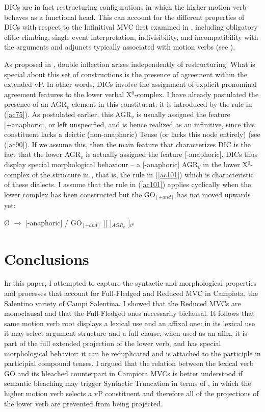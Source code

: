 \documentclass[output=paper]{langscibook}
\begin{document}
DICs are in fact restructuring configurations in which the higher motion verb behaves as a functional head. This can account for the different properties of DICs with respect to the Infinitival MVC first examined in \cite{cardinaletti2001a}, including obligatory clitic climbing, single event interpretation, indivisibility, and incompatibility with the arguments and adjuncts typically associated with motion verbs (see \cite{cardinaletti2001a, cardinaletti2003a, manzini2005a, cruschina2013a, caro2019a}). 

As proposed in \cite{cruschina2021a}, double inflection arises independently of restructuring. What is special about this set of constructions is the presence of agreement within the extended vP. In other words, DICs involve the assignment of explicit pronominal agreement features to the lower verbal X$^0$-complex. I have already postulated the presence of an  AGR$_v$ element in this constituent: it is introduced by the rule in (\ref{ac75}).  As postulated earlier, this AGR$_v$ is usually assigned the feature [+anaphoric], or left unspecified, and is hence realized as an infinitive, since this constituent lacks a deictic (non-anaphoric) Tense (or lacks this node entirely) (see (\ref{ac90}). If we assume this, then the main feature that characterizes DIC is the fact that the lower AGR$_v$ is actually assigned the feature [-anaphoric]. DICs thus display special morphological behaviour  --  a [-anaphoric] AGR$_v$ in the lower X$^0$-complex of the structure in , that is, the rule in (\ref{ac101}) which is characteristic of these dialects. I assume that the rule in (\ref{ac101}) applies cyclically when the lower complex has been constructed but the GO$_{[+and]}$ has not moved upwards yet:
 
\ea \label{ac101}Ø $\rightarrow$ [-anaphoric] /  GO$_{[+and]}$ [[ \underline{\hspace{3em}} ]$_{ AGR_v}$ ]$_{v^0}$
\z

\section{Conclusions} 
 
In this paper, I attempted to capture the syntactic and morphological properties and processes that account for Full-Fledged and Reduced MVC in Campiota, the Salentino variety of Campi Salentina. I showed that the Reduced MVCs are monoclausal and that the Full-Fledged ones necessarily biclausal. It follows that same motion verb root displays a lexical use and an affixal one:  in its lexical use it may select argument structure and a full clause; when used as an affix, it is part of the full extended projection of the lower verb, and has special morphological behavior: it can be reduplicated and is attached to the participle in participial compound tenses. I argued that the relation between the lexical verb GO and its bleached counterpart in Campiota MVCs is better understood if semantic bleaching may trigger Syntactic Truncation  in terms of \citealt{wurmbrand2014a, wurmbrand2015, wurmbrand2017verb}, in which the higher motion verb selects a vP constituent and therefore all of the projections of the lower verb are prevented from being projected. 
 
\end{document}
